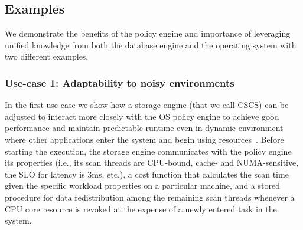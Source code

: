 \documentclass[11pt]{article}
\begin{document}
\subsection*{Examples}
We demonstrate the benefits of the policy engine and importance of leveraging unified knowledge
from both the database engine and the operating system with two different examples.

\subsubsection*{Use-case 1: Adaptability to noisy environments}
In the first use-case we show how a storage engine (that we call CSCS) can be adjusted to 
interact more closely 
with the OS policy engine to achieve good performance and maintain predictable runtime even
in dynamic environment where other applications enter the system and begin using 
resources~\cite{cod:2013}.
Before starting the execution, the storage engine communicates with the policy engine its 
properties (i.e., its scan threads are CPU-bound, cache- and NUMA-sensitive, the SLO 
for latency is 3ms, etc.), a cost 
function that calculates the scan time given the specific workload properties on a 
particular machine, and a stored procedure for data redistribution among the remaining 
scan threads whenever a CPU core resource is revoked at the expense of a newly entered 
task in the system.
\end{document}
